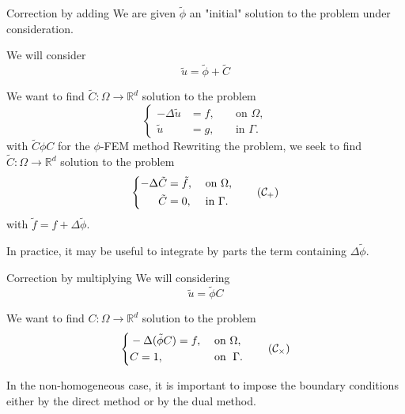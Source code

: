 \documentclass[compress,10pt,xcolor={table,dvipsnames},t]{beamer}
\begin{document}
	\begin{frame}{Correction by adding}
		We are given $\tilde{\phi}$ an "initial" solution to the problem under consideration.
		
		We will consider
		\begin{equation*}
			\tilde{u}=\tilde{\phi}+\tilde{C}
		\end{equation*}
	
		We want to find $\tilde{C}: \Omega \rightarrow \mathbb{R}^d$ solution to the problem
		\begin{equation*}
			\left\{\begin{aligned}
				-\Delta \tilde{u}&=f, \; &&\text{on } \Omega, \\
				\tilde{u}&=g, \; &&\text{in } \Gamma.
			\end{aligned}\right.
		\end{equation*}
		with $\tilde{C}\phi C$ for the $\phi$-FEM method
		Rewriting the problem, we seek to find $\tilde{C}: \Omega \rightarrow \mathbb{R}^d$ solution to the problem
		\begin{equation}
			\left\{\begin{aligned}
				-\Delta \tilde{C}&=\tilde{f}, \; &&\text{on } \Omega, \\
				\tilde{C}&=0, \; &&\text{in } \Gamma.
			\end{aligned}\right. \tag{$\mathcal{C}_{+}$} \label{corr_add}
		\end{equation}
		with $\tilde{f}=f+\Delta\tilde{\phi}$.

		In practice, it may be useful to integrate by parts the term containing $\Delta \tilde{\phi}$.
	\end{frame}

	\begin{frame}{Correction by multiplying}
		We will considering 
		\begin{equation*}
			\tilde{u}=\tilde{\phi}C
		\end{equation*}
		
		We want to find $C: \Omega \rightarrow \mathbb{R}^d$ solution to the problem
		\begin{equation*}
			\left\{\begin{aligned}
				&-\Delta (\tilde{\phi}C)=f, \; &&\text{on } \Omega, \\
				&C=1, \; &&\text{on } \; \Gamma.
			\end{aligned}\right. \tag{$\mathcal{C}_\times$} \label{corr_mult}
		\end{equation*}
		
		In the non-homogeneous case, it is important to impose the boundary conditions either by the direct method or by the dual method.
	\end{frame}
\end{document}
